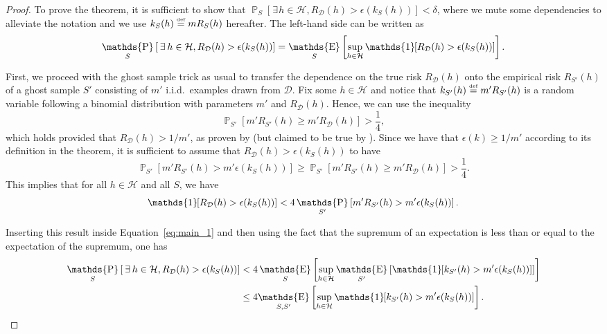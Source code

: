\documentclass[twoside,11pt]{article}
\newcommand{\Id}[1]{\mathds{1}\hspace{-2.5pt}\left[#1\right]}
\let\oldexists=\exists
\renewcommand{\exists}{\hspace{1pt}\oldexists\hspace{1pt}}
\newcommand{\D}{\mathcal{D}}
\renewcommand{\H}{{\mathcal{H}}}
\newcommand{\eqdef}{\overset{\smash{\mbox{\tiny \rm def}}}{=}}
\DeclareMathOperator*{\Prob}{\mathds{P}}
\newcommand{\prob}[2]{\Prob_{#1}\left[#2\right]}
\DeclareMathOperator*{\Expectation}{\mathds{E}}
\newcommand{\exv}[2]{\Expectation_{#1}\left[#2\right]}
\begin{document}
\begin{proof}
To prove the theorem, it is sufficient to show that $\prob{S}{\exists h \in \H, R_\D(h) > \epsilon(k_S(h))} < \delta$, where we mute some dependencies to alleviate the notation and we use $k_S(h)\eqdef m R_S(h)$ hereafter.
The left-hand side can be written as
\begin{equation}\label{eq:main_1}
\prob{S}{\exists h \in \H, R_\D(h) > \epsilon(k_S(h))} = \exv{S}{\sup_{h\in \H} \Id{R_\D(h) > \epsilon(k_S(h))} }.
\end{equation}

First, we proceed with the ghost sample trick as usual to transfer the dependence on the true risk $R_\D(h)$ onto the empirical risk $R_{S'}(h)$ of a ghost sample $S'$ consisting of $m'$ i.i.d.\ examples drawn from $\D$.
Fix some $h\in\H$ and notice that $k_{S'}(h) \eqdef m' R_{S'}(h)$ is a random variable following a binomial distribution with parameters $m'$ and $R_\D(h)$.
Hence, we can use the inequality
\begin{equation}
\prob{S'}{ m'R_{S'}(h) \geq m'R_\D(h)} > \frac{1}{4}, \label{eq:ghost_sample}
\end{equation}
which holds provided that $R_\D(h) > 1 / m'$, as proven by \cite{greenberg14} (but claimed to be true by \cite{as-93}).
Since we have that $\epsilon(k) \geq 1/m'$ according to its definition in the theorem, it is sufficient to assume that $R_\D(h) > \epsilon(k_S(h))$ to have
\begin{equation*}
\prob{S'}{ m' R_{S'}(h) > m' \epsilon(k_S(h)) } \geq \prob{S'}{ m' R_{S'}(h) \geq m' R_\D(h) } > \frac{1}{4}.
\end{equation*}
This implies that for all $h\in\H$ and all $S$, we have
\begin{equation*}
\Id{R_\D(h) > \epsilon(k_S(h))} < 4 \prob{S'}{ m' R_{S'}(h) > m' \epsilon(k_S(h))}.
\end{equation*}

Inserting this result inside Equation~\eqref{eq:main_1} and then using the fact that the supremum of an expectation is less than or equal to the expectation of the supremum, one has
\begin{align}
\prob{S}{\exists h \in \H, R_\D(h) > \epsilon(k_S(h))}
    &< 4 \exv{S}{\sup_{h\in \H} \exv{S'}{\Id{k_{S'}(h) > m'\epsilon(k_S(h))}} }\nonumber\\
    &\le 4\! \exv{S, S'}{\sup_{h\in \H} \Id{k_{S'}(h) > m'\epsilon(k_S(h))}}.\label{eq:main_2}
\end{align}


\end{proof}
\end{document}
